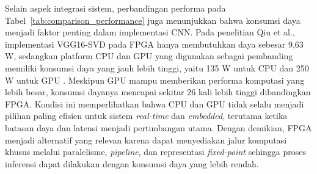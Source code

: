 \begin{table}[ht]
    \centering
    \caption{Perbandingan performa penelitian CNN Accelerator}
    \label{tab:comparison_performance}
\end{table}

Selain aspek integrasi sistem, perbandingan performa pada
Tabel~\ref{tab:comparison_performance} juga menunjukkan bahwa
konsumsi daya menjadi faktor penting dalam implementasi CNN.
Pada penelitian Qiu et al., implementasi VGG16-SVD pada FPGA hanya
membutuhkan daya sebesar 9,63 W, sedangkan platform CPU dan GPU yang
digunakan sebagai pembanding memiliki konsumsi daya yang jauh lebih tinggi,
yaitu 135 W untuk CPU dan 250 W untuk GPU \cite{Qiu2016GoingDeeperFPGA}.
Meskipun GPU mampu memberikan performa komputasi yang lebih besar, konsumsi dayanya
mencapai sekitar 26 kali lebih tinggi dibandingkan FPGA. Kondisi ini memperlihatkan
bahwa CPU dan GPU tidak selalu menjadi pilihan paling efisien untuk sistem
\emph{real-time} dan \emph{embedded}, terutama ketika batasan daya dan latensi
menjadi pertimbangan utama. Dengan demikian, FPGA menjadi alternatif yang relevan
karena dapat menyediakan jalur komputasi khusus melalui paralelisme,
\emph{pipeline}, dan representasi \emph{fixed-point} sehingga proses inferensi dapat
dilakukan dengan konsumsi daya yang lebih rendah.
